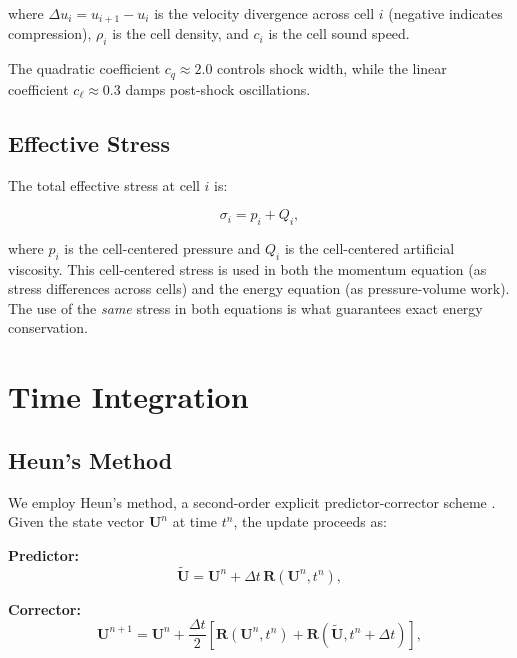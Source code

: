 \documentclass[12pt,a4paper]{article}
\begin{document}
\noindent where $\Delta u_i = u_{i+1} - u_i$ is the velocity divergence across cell $i$ (negative indicates compression), $\rho_i$ is the cell density, and $c_i$ is the cell sound speed.

The quadratic coefficient $c_q \approx 2.0$ controls shock width, while the linear coefficient $c_\ell \approx 0.3$ damps post-shock oscillations.

\subsection{Effective Stress}

The total effective stress at cell $i$ is:

\begin{equation}
    \sigma_i = p_i + Q_i,
    \label{eq:effective_stress}
\end{equation}

\noindent where $p_i$ is the cell-centered pressure and $Q_i$ is the cell-centered artificial viscosity. This cell-centered stress is used in both the momentum equation (as stress differences across cells) and the energy equation (as pressure-volume work). The use of the \emph{same} stress in both equations is what guarantees exact energy conservation.

\section{Time Integration}
\label{sec:time}

\subsection{Heun's Method}

We employ Heun's method, a second-order explicit predictor-corrector scheme \citep{Butcher2016}. Given the state vector $\mathbf{U}^n$ at time $t^n$, the update proceeds as:

\textbf{Predictor:}
\begin{equation}
    \tilde{\mathbf{U}} = \mathbf{U}^n + \Delta t \, \mathbf{R}(\mathbf{U}^n, t^n),
    \label{eq:predictor}
\end{equation}

\textbf{Corrector:}
\begin{equation}
    \mathbf{U}^{n+1} = \mathbf{U}^n + \frac{\Delta t}{2} \left[ \mathbf{R}(\mathbf{U}^n, t^n) + \mathbf{R}(\tilde{\mathbf{U}}, t^n + \Delta t) \right],
    \label{eq:corrector}
\end{equation}
\end{document}

